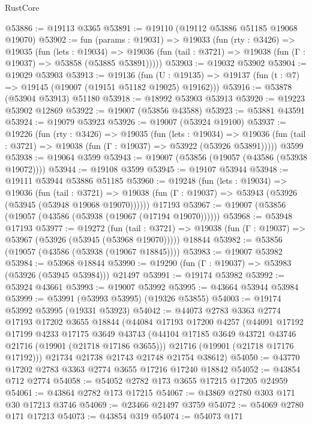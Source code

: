 \begin{lexlean}{RustCore}
\begin{coremodule}
@53886 := @19113 @3365
@53891 := @19110 (@19112 @53886 @51185 @19068 @19070)
@53902 := fun (params : @19031) =>
  @19033
    (fun (rty : @3426) =>
    @19035
      (fun (lets : @19034) =>
      @19036 (fun (tail : @3721) => @19038 (fun (Γ : @19037) => @53858 (@53885 @53891)))))
@53903 := @19032 @53902
@53904 := @19029 @53903
@53913 := @19136
    (fun (U : @19135) => @19137 (fun (t : @7) => @19145 (@19007 (@19151 @51182 @19025) @19162)))
@53916 := @53878 (@53904 @53913) @51180
@53918 := @18992 @53903 @53913
@53920 := @19223 @53902 @12869
@53922 := @19007 (@53856 @43588)
@53923 := @53881 @43591
@53924 := @19079 @53923
@53926 := @19007 (@53924 @19100)
@53937 := @19226
    (fun (rty : @3426) =>
    @19035
      (fun (lets : @19034) =>
      @19036 (fun (tail : @3721) => @19038 (fun (Γ : @19037) => @53922 (@53926 @53891)))))
    @3599
@53938 := @19064 @3599
@53943 := @19007 (@53856 (@19057 (@43586 (@53938 @19072))))
@53944 := @19108 @3599
@53945 := @19107 @53944
@53948 := @19111 @53944 @53886 @51185
@53960 := @19248
    (fun (lets : @19034) =>
    @19036
      (fun (tail : @3721) =>
      @19038 (fun (Γ : @19037) => @53943 (@53926 (@53945 (@53948 @19068 @19070))))))
    @17193
@53967 := @19007 (@53856 (@19057 (@43586 (@53938 (@19067 (@17194 @19070))))))
@53968 := @53948 @17193
@53977 := @19272
    (fun (tail : @3721) => @19038 (fun (Γ : @19037) => @53967 (@53926 (@53945 (@53968 @19070)))))
    @18844
@53982 := @53856 (@19057 (@43586 (@53938 (@19067 @18845))))
@53983 := @19007 @53982
@53984 := @53968 @18844
@53990 := @19290 (fun (Γ : @19037) => @53983 (@53926 (@53945 @53984))) @21497
@53991 := @19174 @53982
@53992 := @53924 @43661
@53993 := @19007 @53992
@53995 := @43664 @53944 @53984
@53999 := @53991 (@53993 @53995) (@19326 @53855)
@54003 := @19174 @53992 @53995 (@19331 @53923)
@54042 := @44073
    @2783
    @3363
    @2774
    @17193
    @17202
    @3655
    @18844
    (@44084
      @17193
      @17200
      @4257
      (@44091
        @17192
        @17199
        @4233
        @17175
        @3649
        @43743
        (@44104 @17185 @3649 @43721 @43746 @21716 (@19901 (@21718 @17186 @3655)))
        @21716
        (@19901 (@21718 @17176 @17192)))
      @21734
      @21738
      @21743
      @21748
      @21754
      @38612)
@54050 := @43770 @17202 @2783 @3363 @2774 @3655 @17216 @17240 @18842
@54052 := @43854 @712 @2774
@54058 := @54052 @2782 @173 @3655 @17215 @17205 @24959
@54061 := @43864 @2782 @173 @17215
@54067 := @43869 @2780 @303 @171 @30 @17213 @3746
@54069 := @23466 @21497 @3759
@54072 := @54069 @2780 @171 @17213
@54073 := @43854 @319
@54074 := @54073 @171

\end{coremodule}
\end{lexlean}
